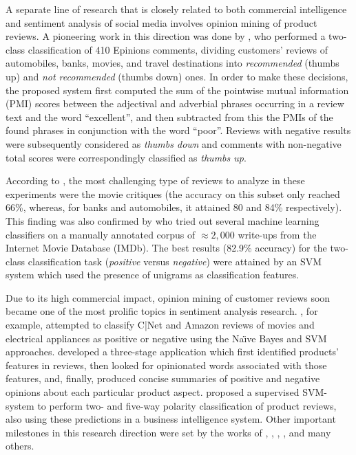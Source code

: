A separate line of research that is closely related to both commercial
intelligence and sentiment analysis of social media involves opinion
mining of product reviews.  A pioneering work in this direction was
done by \citet{Turney:02}, who performed a two-class classification of
410 Epinions comments, dividing customers' reviews of automobiles,
banks, movies, and travel destinations into \emph{recommended} (thumbs
up) and \emph{not recommended} (thumbs down) ones.  In order to make
these decisions, the proposed system first computed the sum of the
pointwise mutual information (PMI) scores between the adjectival and
adverbial phrases occurring in a review text and the word
``excellent'', and then subtracted from this the PMIs of the found
phrases in conjunction with the word ``poor''.  Reviews with negative
results were subsequently considered as \emph{thumbs down} and
comments with non-negative total scores were correspondingly
classified as \emph{thumbs up}.

According to \citet{Turney:02}, the most challenging type of reviews
to analyze in these experiments were the movie critiques (the accuracy
on this subset only reached 66\%, whereas, for banks and automobiles,
it attained 80 and 84\% respectively).  This finding was also
confirmed by \citet{Pang:02} who tried out several machine learning
classifiers on a manually annotated corpus of $\approx2,000$ write-ups
from the Internet Movie Database (IMDb).  The best results (82.9\%
accuracy) for the two-class classification task (\emph{positive}
versus \emph{negative}) were attained by an SVM system which used the
presence of unigrams as classification features.

Due to its high commercial impact, opinion mining of customer reviews
soon became one of the most prolific topics in sentiment analysis
research.  \citet{Dave:03}, for example, attempted to classify C|Net
and Amazon reviews of movies and electrical appliances as positive or
negative using the Na\"{\i}ve Bayes and SVM approaches.  \citet{Hu:04}
developed a three-stage application which first identified products'
features in reviews, then looked for opinionated words associated with
those features, and, finally, produced concise summaries of positive
and negative opinions about each particular product aspect.
\citet{Funk:08} proposed a supervised SVM-system to perform two- and
five-way polarity classification of product reviews, also using these
predictions in a business intelligence system.  Other important
milestones in this research direction were set by the works of
\citet{Popescu:05}, \citet{Ding:09}, \citet{Wei:10},
\citet{Mukherjee:12}, and many others.

